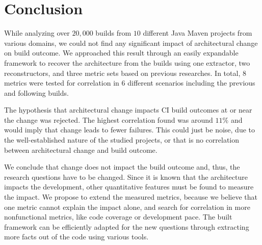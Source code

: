 \documentclass[conference]{IEEEtran}
\begin{document}
\section{Conclusion}

While analyzing over $20,000$ builds from $10$ different Java Maven projects from various domains, we could not find any significant impact of architectural change on build outcome.
We approached this result through an easily expandable framework to recover the architecture from the builds using one extractor, two reconstructors, and three metric sets based on previous researches. In total, $8$ metrics were tested for correlation in $6$ different scenarios including the previous and following builds. 

The hypothesis that architectural change impacts CI build outcomes at or near the change was rejected. The highest correlation found was around $11\%$ and would imply that change leads to fewer failures. This could just be noise, due to the well-established nature of the studied projects, or that is no correlation between architectural change and build outcome. 

We conclude that change does not impact the build outcome and, thus, the research questions have to be changed. Since it is known that the architecture impacts the development, other quantitative features must be found to measure the impact. We propose to extend the measured metrics, because we believe that one metric cannot explain the impact alone, and search for correlation in more nonfunctional metrics, like code coverage or development pace.
The built framework can be efficiently adapted for the new questions through extracting more facts out of the code using various tools. 



\end{document}
